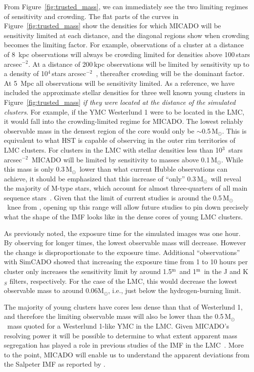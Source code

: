 \documentclass[referee]{aa}
\newcommand{\m}{$^\mathrm{m}$~}
\newcommand{\msun}{M$_\odot$~}
\newcommand{\msune}{M$_\odot$}
\newcommand{\s}{$\sim$}
\newcommand{\h}[1]{$^{#1}$}
\newcommand{\spa}{stars arcsec$^{-2}$~}
\newcommand{\spae}{stars arcsec$^{-2}$}
\begin{document}
From Figure~\ref{fig:trusted_mass}, we can immediately see the two limiting regimes of sensitivity and crowding.
The flat parts of the curves in Figure~\ref{fig:trusted_mass} show the densities for which MICADO will be sensitivity limited at each distance, and the diagonal regions show when crowding becomes the limiting factor.
For example, observations of a cluster at a distance of 8\, kpc observations will always be crowding limited for densities above 100\,\spae.
At a distance of 200\,kpc observations will be limited by sensitivity up to a density of 10\h4\,\spa, thereafter crowding will be the dominant factor.
At 5\, Mpc all observations will be sensitivity limited.
As a reference, we have included the approximate stellar densities for three well known young clusters in Figure~\ref{fig:trusted_mass} \textit{if they were located at the distance of the simulated clusters}.
For example, if the YMC Westerlund 1 were to be located in the LMC, it would fall into the crowding-limited regime for MICADO\@.
The lowest reliably observable mass in the densest region of the core would only be \s0.5\,\msune.
This is equivalent to what HST is capable of observing in the outer rim territories of LMC clusters.
For clusters in the LMC with stellar densities less than 10\h3~\spa MICADO will be limited by sensitivity to masses above 0.1\,\msune.
While this mass is only 0.3\,\msun lower than what current Hubble observations can achieve, it should be emphasized that this increase of ``only'' 0.3\,\msun will reveal the majority of M-type stars, which account for almost three-quarters of all main sequence stars~\citep{ledrew2001}.
Given that the limit of current studies is around the 0.5\,\msun knee from \citet{kroupa2001}, opening up this range will allow future studies to pin down precisely what the shape of the IMF looks like in the dense cores of young LMC clusters.

As previously noted, the exposure time for the simulated images was one hour.
By observing for longer times, the lowest observable mass will decrease.
However the change is disproportionate to the exposure time.
Additional ``observations'' with SimCADO showed that increasing the exposure time from 1 to 10 hours per cluster only increases the sensitivity limit by around 1.5\m and 1\m in the J and K$_S$ filters, respectively.
For the case of the LMC, this would decrease the lowest observable mass to around 0.06\msune, i.e., just below the hydrogen-burning limit.

The majority of young clusters have cores less dense than that of Westerlund 1, and therefore the limiting observable mass will also be lower than the 0.5\,\msun mass quoted for a Westerlund 1-like YMC in the LMC\@.
Given MICADO's resolving power it will be possible to determine to what extent apparent mass segregation has played a role in previous studies of the IMF in the LMC~\citep{Ascenso2009-de}.
More to the point, MICADO will enable us to understand the apparent deviations from the Salpeter IMF as reported by \citet{dario2009, geha2013, kalirai2013}.
\end{document}

